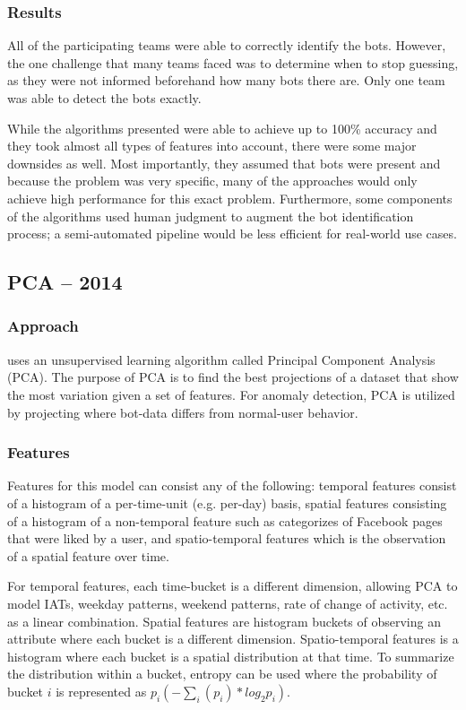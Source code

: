 \documentclass[11pt, oneside]{article}   	%
\begin{document}
\subsubsection*{Results}

\quad All of the participating teams were able to correctly identify the bots.
However, the one challenge that many teams faced was to determine when to stop guessing, as they were not informed beforehand how many bots there are.
Only one team was able to detect the bots exactly.

\quad While the algorithms presented were able to achieve up to 100\% accuracy and they took almost all types of features into account, there were some major downsides as well.
Most importantly, they assumed that bots were present and because the problem was very specific, many of the approaches would only achieve high performance for this exact problem.
Furthermore, some components of the algorithms used human judgment to augment the bot identification process; a semi-automated pipeline would be less efficient for real-world use cases.

\subsection*{PCA -- 2014}

\subsubsection*{Approach}

\quad \cite{pca} uses an unsupervised learning algorithm called Principal Component Analysis (PCA).
The purpose of PCA is to find the best projections of a dataset that show the most variation given a set of features.
For anomaly detection, PCA is utilized by projecting where bot-data differs from normal-user behavior.

\subsubsection*{Features}

\quad Features for this model can consist any of the following: temporal features consist of a histogram of a per-time-unit (e.g. per-day) basis, spatial features consisting of a histogram of a non-temporal feature such as categorizes of Facebook pages that were liked by a user, and spatio-temporal features which is the observation of a spatial feature over time.

\quad For temporal features, each time-bucket is a different dimension, allowing PCA to model IATs, weekday patterns, weekend patterns, rate of change of activity, etc. as a linear combination.
Spatial features are histogram buckets of observing an attribute where each bucket is a different dimension.
Spatio-temporal features is a histogram where each bucket is a spatial distribution at that time.
To summarize the distribution within a bucket, entropy can be used where the probability of bucket $i$ is represented as $p_i (- \sum_i (p_i) * log_2 p_i)$.
\end{document}

